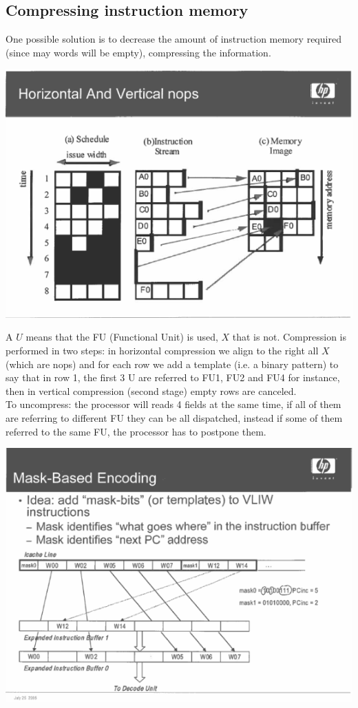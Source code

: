 \subsection{Compressing instruction memory}
One possible solution is to decrease the amount of instruction memory required (since may words will be empty), compressing the information.

\begin{center}
  \includegraphics[width=0.8\linewidth]{img/img3/compr1}
\end{center}

A $U$ means that the FU (Functional Unit) is used, $X$ that is not. Compression is performed in two steps: in horizontal compression we align to the right all $X$ (which are nops) and for each row we add a template (i.e. a binary pattern) to say that in row 1, the first 3 U are referred to FU1, FU2 and FU4 for instance, then in vertical compression (second stage) empty rows are canceled.\\

To uncompress: the processor will reads 4 fields at the same time, if all of them are referring to different FU they can be all dispatched, instead if some of them referred to the same FU, the processor has to postpone them.

\begin{center}
  \includegraphics[width=0.8\linewidth]{img/img3/compr2}
\end{center}

